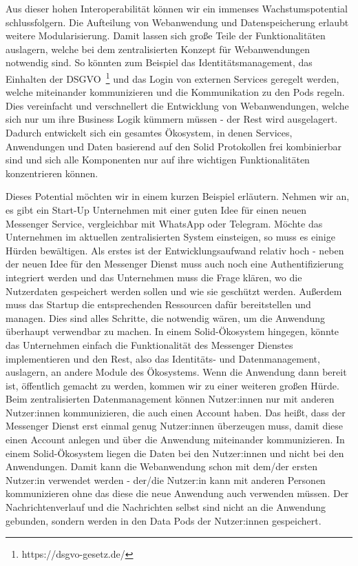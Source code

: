 \documentclass[acmtog]{acmart}
\begin{document}
Aus dieser hohen Interoperabilität können wir ein immenses Wachstumspotential schlussfolgern. Die Aufteilung von Webanwendung und Datenspeicherung erlaubt weitere Modularisierung. Damit lassen sich große Teile der Funktionalitäten auslagern, welche bei dem zentralisierten Konzept für Webanwendungen notwendig sind. So könnten zum Beispiel das Identitätsmanagement, das Einhalten der DSGVO~\footnote{https://dsgvo-gesetz.de/} und das Login von externen Services geregelt werden, welche miteinander kommunizieren und die Kommunikation zu den Pods regeln. Dies vereinfacht und verschnellert die Entwicklung von Webanwendungen, welche sich nur um ihre Business Logik kümmern müssen - der Rest wird ausgelagert. Dadurch entwickelt sich ein gesamtes Ökosystem, in denen Services, Anwendungen und Daten basierend auf den Solid Protokollen frei kombinierbar sind und sich alle Komponenten nur auf ihre wichtigen Funktionalitäten konzentrieren können. 

Dieses Potential möchten wir in einem kurzen Beispiel erläutern. Nehmen wir an, es gibt ein Start-Up Unternehmen mit einer guten Idee für einen neuen Messenger Service, vergleichbar mit WhatsApp oder Telegram. Möchte das Unternehmen im aktuellen zentralisierten System einsteigen, so muss es einige Hürden bewältigen. 
Als erstes ist der Entwicklungsaufwand relativ hoch - neben der neuen Idee für den Messenger Dienst muss auch noch eine Authentifizierung integriert werden und das Unternehmen muss die Frage klären, wo die Nutzerdaten gespeichert werden sollen und wie sie geschützt werden. Außerdem muss das Startup die entsprechenden Ressourcen dafür bereitstellen und managen. Dies sind alles Schritte, die notwendig wären, um die Anwendung überhaupt verwendbar zu machen. In einem Solid-Ökosystem hingegen, könnte das Unternehmen einfach die Funktionalität des Messenger Dienstes implementieren und den Rest, also das Identitäts- und Datenmanagement, auslagern, an andere Module des Ökosystems. 
Wenn die Anwendung dann bereit ist, öffentlich gemacht zu werden, kommen wir zu einer weiteren großen Hürde. Beim zentralisierten Datenmanagement können Nutzer:innen nur mit anderen Nutzer:innen kommunizieren, die auch einen Account haben. Das heißt, dass der Messenger Dienst erst einmal genug Nutzer:innen überzeugen muss, damit diese einen Account anlegen und über die Anwendung miteinander kommunizieren. In einem Solid-Ökosystem liegen die Daten bei den Nutzer:innen und nicht bei den Anwendungen. Damit kann die Webanwendung schon mit dem/der ersten Nutzer:in verwendet werden - der/die Nutzer:in kann mit anderen Personen kommunizieren ohne das diese die neue Anwendung auch verwenden müssen. Der Nachrichtenverlauf und die Nachrichten selbst sind nicht an die Anwendung gebunden, sondern werden in den Data Pods der Nutzer:innen gespeichert.
\end{document}
